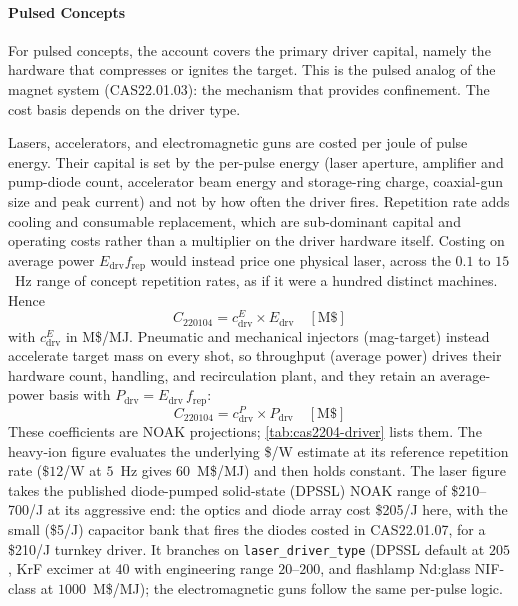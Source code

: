 \documentclass{article}
\begin{document}
\paragraph{Pulsed Concepts}
For pulsed concepts, the account covers the primary driver capital, namely
the hardware that compresses or ignites the target. This is the pulsed
analog of the magnet system (CAS22.01.03): the mechanism that provides
confinement. The cost basis depends on the driver type.

Lasers, accelerators, and electromagnetic guns are costed per joule of pulse
energy. Their capital is set by the per-pulse energy (laser aperture,
amplifier and pump-diode count, accelerator beam energy and storage-ring
charge, coaxial-gun size and peak current) and not by how often the driver
fires. Repetition rate adds cooling and consumable replacement, which are
sub-dominant capital and operating costs rather than a multiplier on the
driver hardware itself. Costing on average power $E_{\text{drv}}
f_{\text{rep}}$ would instead price one physical laser, across the $0.1$ to
$15$~Hz range of concept repetition rates, as if it were a hundred distinct
machines.
Hence
\begin{equation}
C_{220104} = c^{E}_{\text{drv}} \times E_{\text{drv}} \quad [\text{M\$}]
\end{equation}
with $c^{E}_{\text{drv}}$ in M\$/MJ. Pneumatic and mechanical injectors
(mag-target) instead accelerate target mass on every shot, so throughput
(average power) drives their hardware count, handling, and recirculation
plant, and they retain an average-power basis with $P_{\text{drv}} =
E_{\text{drv}} \, f_{\text{rep}}$:
\begin{equation}
C_{220104} = c^{P}_{\text{drv}} \times P_{\text{drv}} \quad [\text{M\$}]
\end{equation}
These coefficients are NOAK projections; \cref{tab:cas2204-driver} lists
them. The heavy-ion figure evaluates the underlying \$/W estimate at its
reference repetition rate ($\$12$/W at $5$~Hz gives $60$~M\$/MJ) and then
holds constant. The laser figure takes the published diode-pumped
solid-state (DPSSL) NOAK range of \$210--700/J at its aggressive end: the
optics and diode array cost \$205/J here, with the small (\$5/J) capacitor
bank that fires the diodes costed in CAS22.01.07, for a \$210/J turnkey
driver. It branches on \texttt{laser\_driver\_type} (DPSSL default at $205$,
KrF excimer at $40$ with engineering range $20$--$200$, and flashlamp
Nd:glass NIF-class at $1000$~M\$/MJ); the electromagnetic guns follow the
same per-pulse logic.
\end{document}
